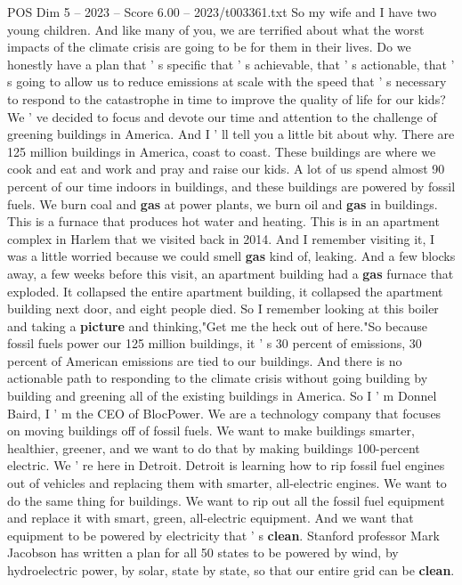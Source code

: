 \begin{textsample}{POS Dim 5 – 2023 – Score 6.00 – 2023/t003361.txt}  \label{ex:f5_pos_072}
So my wife and I have two young children.
And like many of you, we are terrified about what the worst impacts of the climate crisis are going to be for them in their lives.
Do we honestly have a plan that ' s specific that ' s achievable, that ' s actionable, that ' s going to allow us to reduce emissions at scale with the speed that ' s necessary to respond to the catastrophe in time to improve the quality of life for our kids?
We ' ve decided to focus and devote our time and attention to the challenge of greening buildings in America.
And I ' ll tell you a little bit about why.
There are 125 million buildings in America, coast to coast.
These buildings are where we cook and eat and work and pray and raise our kids.
A lot of us spend almost 90 percent of our time indoors in buildings, and these buildings are powered by fossil fuels.
We burn coal and \textbf{gas} at power plants, we burn oil and \textbf{gas} in buildings.
This is a furnace that produces hot water and heating.
This is in an apartment complex in Harlem that we visited back in 2014.
And I remember visiting it, I was a little worried because we could smell \textbf{gas} kind of, leaking.
And a few blocks away, a few weeks before this visit, an apartment building had a \textbf{gas} furnace that exploded.
It collapsed the entire apartment building, it collapsed the apartment building next door, and eight people died.
So I remember looking at this boiler and taking a \textbf{picture} and thinking,"Get me the heck out of here."So because fossil fuels power our 125 million buildings, it ' s 30 percent of emissions, 30 percent of American emissions are tied to our buildings.
And there is no actionable path to responding to the climate crisis without going building by building and greening all of the existing buildings in America.
So I ' m Donnel Baird, I ' m the CEO of BlocPower.
We are a technology company that focuses on moving buildings off of fossil fuels.
We want to make buildings smarter, healthier, greener, and we want to do that by making buildings 100-percent electric.
We ' re here in Detroit.
Detroit is learning how to rip fossil fuel engines out of vehicles and replacing them with smarter, all-electric engines.
We want to do the same thing for buildings.
We want to rip out all the fossil fuel equipment and replace it with smart, green, all-electric equipment.
And we want that equipment to be powered by electricity that ' s \textbf{clean}.
Stanford professor Mark Jacobson has written a plan for all 50 states to be powered by wind, by hydroelectric power, by solar, state by state, so that our entire grid can be \textbf{clean}.

\end{textsample}
